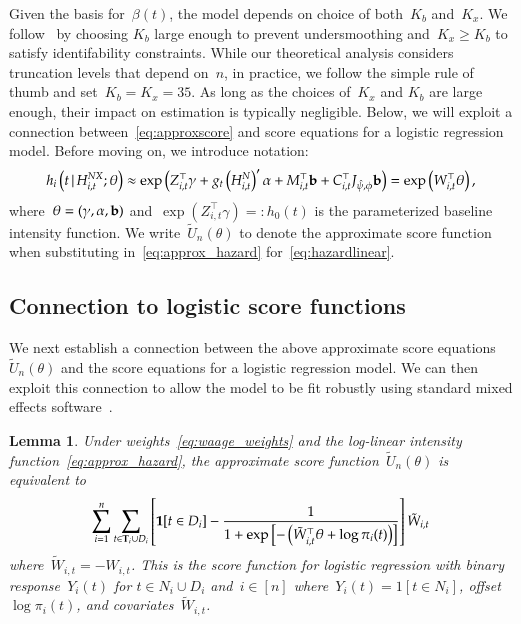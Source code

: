 \documentclass[12pt]{amsart}
\newtheorem{lemma}[thm]{Lemma}
\def\given{\, | \,}
\def\bfT{{\bf T}}
\begin{document}
Given the basis for~$\beta(t)$, the model depends on choice of
both~$K_b$ and~$K_x$.  We follow~\cite{Ruppert2002} by choosing $K_b$
large enough to prevent undersmoothing and~$K_x \geq K_b$ to satisfy
identifability constraints.
While our theoretical analysis considers truncation levels that depend
on~$n$, in practice, we follow the simple rule of thumb and set~$K_b 
= K_x = 35$. As long as the choices of~$K_x$ and $K_b$ are large
enough, their impact on estimation is typically negligible. 
Below, we will exploit a connection between~\eqref{eq:approxscore}
and score equations for a logistic regression model.  Before moving
on, we introduce notation:
\begin{equation}
\label{eq:approx_hazard}
h_i \left( t \given  H_{i,t}^{NX} ; \theta \right) \approx
\exp \left( Z_{i,t}^\top \gamma + g_t \left( H_{i,t}^{N} \right)^{\prime} \alpha
  + M_{i,t}^\top {\bf b} + C_{i,t}^\top J_{\hat \psi, \phi} {\bf b} \right)
= \exp \left( W_{i,t}^\top \theta \right),
\end{equation}
where~$\theta = (\gamma, \alpha, {\bf b})$ and~$\exp (
Z_{i,t}^\top \gamma) =: h_0 (t)$ is the parameterized baseline
intensity function. We write~$\tilde U_n (\theta)$ to denote
the approximate score function when substituting
in~\eqref{eq:approx_hazard} for~\eqref{eq:hazardlinear}.



\subsection{Connection to logistic score functions}

We next establish a connection between the above approximate score 
equations~$\tilde U_n (\theta)$ and the score equations for a logistic
regression model. We can then exploit this connection to allow the
model to be fit robustly using standard mixed effects
software~\citep{Ruppert2002, McCulloch2001}.

\begin{lemma} \normalfont
\label{lemma:logistic}
Under weights~\eqref{eq:waage_weights} and the log-linear intensity
function~\eqref{eq:approx_hazard}, the approximate score
function~$\tilde U_n (\theta)$ is equivalent to 
\[
\sum_{i=1}^n \sum_{t \in \bfT_i \cup D_i } \left[ {\bf 1}[t \in D_i]
  - \frac{1}{1 + \exp \left[- \left( \tilde{W}_{i,t}^\top \theta +
        \log \pi_i (t) \right) \right]} \right] \tilde{W}_{i,t} 
\]
where~$\tilde W_{i,t} = -W_{i,t}$. This is the score function for
logistic regression with binary response~$Y_i(t)$ for $t \in N_i \cup
D_i$ and~$i \in [n]$ where~$Y_i(t) = 1[t \in N_i]$, offset~$\log \pi_i
(t)$, and covariates~$\tilde W_{i,t}$. 
\end{lemma}
\end{document}
